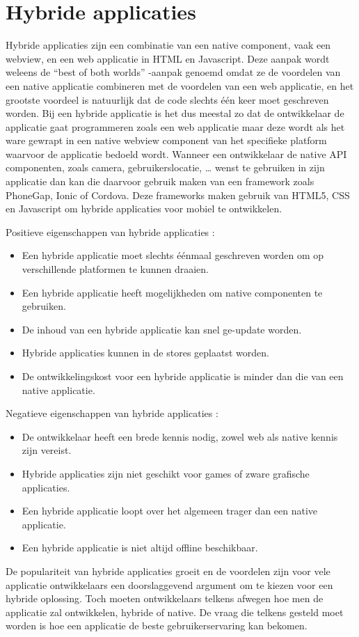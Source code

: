\section{Hybride applicaties}\label{section:hybride}

Hybride applicaties zijn een combinatie van een native component, vaak een webview, en een web applicatie in HTML en Javascript. Deze aanpak wordt weleens de “best of both worlds” -aanpak genoemd omdat ze de voordelen van een native applicatie combineren met de voordelen van een web applicatie, en het grootste voordeel is natuurlijk dat de code slechts één keer moet geschreven worden. Bij een hybride applicatie is het dus meestal zo dat de ontwikkelaar de applicatie gaat programmeren zoals een web applicatie maar deze wordt als het ware gewrapt in een native webview component van het specifieke platform waarvoor de applicatie bedoeld wordt. 
Wanneer een ontwikkelaar de native API componenten, zoals camera, gebruikerslocatie, … wenst te gebruiken in zijn applicatie dan kan die daarvoor gebruik maken van een framework zoals PhoneGap, Ionic of Cordova. Deze frameworks maken gebruik van HTML5, CSS en Javascript om hybride applicaties voor mobiel te ontwikkelen.

Positieve eigenschappen van hybride applicaties : 
\begin{itemize}
	\item Een hybride applicatie moet slechts éénmaal geschreven worden om op verschillende platformen te kunnen draaien. 
	\item Een hybride applicatie heeft mogelijkheden om native componenten te gebruiken.
	\item De inhoud van een hybride applicatie kan snel ge-update worden.
	\item Hybride applicaties kunnen in de stores geplaatst worden.
	\item De ontwikkelingskost voor een hybride applicatie is minder dan die van een native applicatie.
\end{itemize}
Negatieve eigenschappen van hybride applicaties : 
\begin{itemize}
	\item De ontwikkelaar heeft een brede kennis nodig, zowel web als native kennis zijn vereist.
	\item Hybride applicaties zijn niet geschikt voor games of zware grafische applicaties.
	\item Een hybride applicatie loopt over het algemeen trager dan een native applicatie.
	\item Een hybride applicatie is niet altijd offline beschikbaar.
\end{itemize}
De populariteit van hybride applicaties groeit en de voordelen zijn voor vele applicatie ontwikkelaars een doorslaggevend argument om te kiezen voor een hybride oplossing. Toch moeten ontwikkelaars telkens afwegen hoe men de applicatie zal ontwikkelen, hybride of native. De vraag die telkens gesteld moet worden is hoe een applicatie de beste gebruikerservaring kan bekomen.


